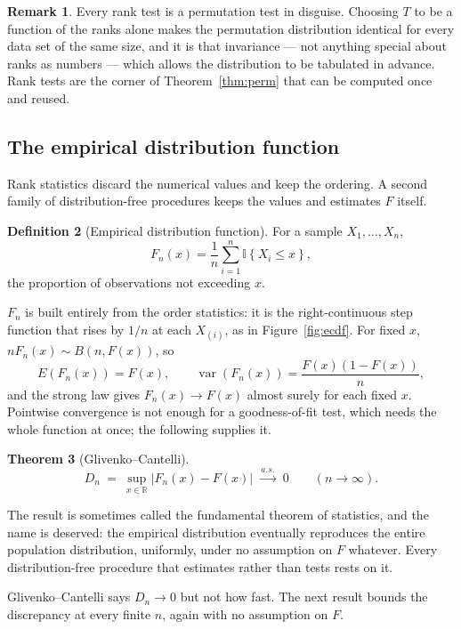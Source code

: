 \documentclass[12pt,a4paper]{report}
\theoremstyle{definition}
\newtheorem{thm}{Theorem}[section]
\newtheorem{defn}[thm]{Definition}
\newtheorem{remark}[thm]{Remark}
\theoremstyle{plain}
\begin{document}
\begin{remark}
Every rank test is a permutation test in disguise. Choosing $T$ to be a function
of the ranks alone makes the permutation distribution identical for every data
set of the same size, and it is that invariance --- not anything special about
ranks as numbers --- which allows the distribution to be tabulated in advance.
Rank tests are the corner of Theorem~\ref{thm:perm} that can be computed once
and reused.
\end{remark}

\subsection*{The empirical distribution function}

Rank statistics discard the numerical values and keep the ordering. A second
family of distribution-free procedures keeps the values and estimates $F$
itself.

\begin{defn}[Empirical distribution function]
For a sample $X_1,\dots,X_n$,
$$F_n(x) = \frac{1}{n}\sum^{n}_{i=1}\mathbb{I}\left\{X_i\leq x\right\},$$
the proportion of observations not exceeding $x$.
\end{defn}

$F_n$ is built entirely from the order statistics: it is the right-continuous
step function that rises by $1/n$ at each $X_{(i)}$, as in
Figure~\ref{fig:ecdf}. For fixed $x$, $nF_n(x)\sim B\left(n,F(x)\right)$, so
$$E\left(F_n(x)\right) = F(x),\qquad
\operatorname{var}\left(F_n(x)\right) = \frac{F(x)\left(1-F(x)\right)}{n},$$
and the strong law gives $F_n(x)\to F(x)$ almost surely for each fixed $x$.
Pointwise convergence is not enough for a goodness-of-fit test, which needs the
whole function at once; the following supplies it.

\begin{thm}[Glivenko--Cantelli]
\label{thm:gc}
$$D_n \ =\ \sup_{x\in\mathbb{R}}\left|F_n(x) - F(x)\right|
\ \xrightarrow{\ a.s.\ }\ 0 \qquad (n\to\infty).$$
\end{thm}

The result is sometimes called the fundamental theorem of statistics, and the
name is deserved: the empirical distribution eventually reproduces the entire
population distribution, uniformly, under no assumption on $F$ whatever. Every
distribution-free procedure that estimates rather than tests rests on it.

Glivenko--Cantelli says $D_n\to 0$ but not how fast. The next result bounds the
discrepancy at every finite $n$, again with no assumption on $F$.
\end{document}
